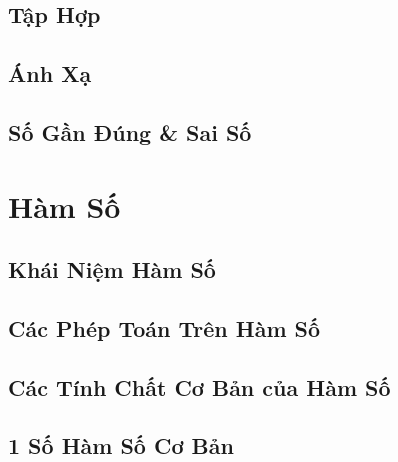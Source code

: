 \documentclass{article}
\numberwithin{equation}{section}
\begin{document}

\subsection{Tập Hợp}


\subsection{Ánh Xạ}


\subsection{Số Gần Đúng \& Sai Số}


\section{Hàm Số}

\subsection{Khái Niệm Hàm Số}


\subsection{Các Phép Toán Trên Hàm Số}


\subsection{Các Tính Chất Cơ Bản của Hàm Số}


\subsection{1 Số Hàm Số Cơ Bản}
\end{document}
